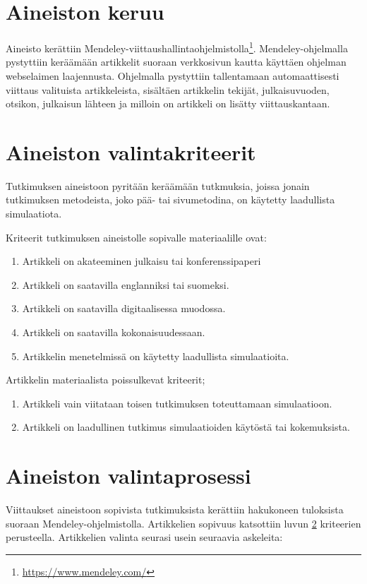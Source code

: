\documentclass[utf8]{gradu3}
\begin{document}
\section{Aineiston keruu} \label{aineiston keruu}
Aineisto kerättiin Mendeley-viittaushallintaohjelmistolla\footnote{\url{https://www.mendeley.com/}}. Mendeley-ohjelmalla pystyttiin keräämään artikkelit suoraan verkkosivun kautta käyttäen ohjelman webselaimen laajennusta. Ohjelmalla pystyttiin tallentamaan automaattisesti viittaus valituista artikkeleista, sisältäen artikkelin tekijät, julkaisuvuoden, otsikon, julkaisun lähteen ja milloin on artikkeli on lisätty viittauskantaan.


\section{Aineiston valintakriteerit} \label{valintakriteerit}
Tutkimuksen aineistoon pyritään keräämään tutkmuksia, joissa jonain tutkimuksen metodeista, joko pää- tai sivumetodina, on käytetty laadullista simulaatiota.

Kriteerit tutkimuksen aineistolle sopivalle materiaalille ovat:
\begin{enumerate}
    \item Artikkeli on akateeminen julkaisu tai konferenssipaperi
    \item Artikkeli on saatavilla englanniksi tai suomeksi.
    \item Artikkeli on saatavilla digitaalisessa muodossa.
    \item Artikkeli on saatavilla kokonaisuudessaan.
    \item Artikkelin menetelmissä on käytetty laadullista simulaatioita.
\end{enumerate}

Artikkelin materiaalista poissulkevat kriteerit;
\begin{enumerate}
    \item Artikkeli vain viitataan toisen tutkimuksen toteuttamaan simulaatioon.
    \item Artikkeli on laadullinen tutkimus simulaatioiden käytöstä tai kokemuksista.
\end{enumerate}

\section{Aineiston valintaprosessi} \label{valintaprosessi}
Viittaukset aineistoon sopivista tutkimuksista kerättiin hakukoneen tuloksista suoraan Mendeley-ohjelmistolla. Artikkelien sopivuus katsottiin luvun \ref{valintakriteerit} kriteerien perusteella. Artikkelien valinta seurasi usein seuraavia askeleita:
\end{document}
